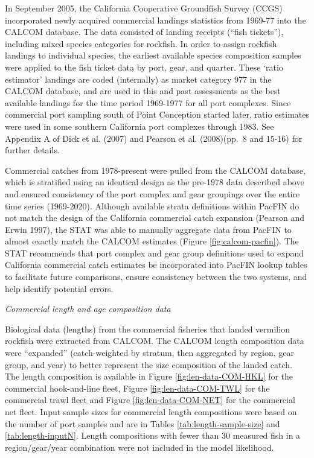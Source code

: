 \documentclass[11pt,
  english,
]{article}
\begin{document}
In September 2005, the California Cooperative Groundfish Survey (CCGS) incorporated newly acquired commercial landings statistics from 1969-77 into the CALCOM database. The data consisted of landing receipts (``fish tickets''), including mixed species categories for rockfish. In order to assign rockfish landings to individual species, the earliest available species composition samples were applied to the fish ticket data by port, gear, and quarter. These `ratio estimator' landings are coded (internally) as market category 977 in the CALCOM database, and are used in this and past assessments as the best available landings for the time period 1969-1977 for all port complexes. Since commercial port sampling south of Point Conception started later, ratio estimates were used in some southern California port complexes through 1983. See Appendix A of Dick et al. {(2007)\leavevmode\tagmcend\tagstructend} and Pearson et al. {(2008)\leavevmode\tagmcend\tagstructend}(pp.~8 and 15-16) for further details.

Commercial catches from 1978-present were pulled from the CALCOM database, which is stratified using an identical design as the pre-1978 data described above and ensured consistency of the port complex and gear groupings over the entire time series (1969-2020). Although available strata definitions within PacFIN do not match the design of the California commercial catch expansion {(Pearson and Erwin 1997)\leavevmode\tagmcend\tagstructend}, the STAT was able to manually aggregate data from PacFIN to almost exactly match the CALCOM estimates (Figure \ref{fig:calcom-pacfin}). The STAT recommends that port complex and gear group definitions used to expand California commercial catch estimates be incorporated into PacFIN lookup tables to facilitate future comparisons, ensure consistency between the two systems, and help identify potential errors.

\emph{Commercial length and age composition data}

Biological data (lengths) from the commercial fisheries that landed vermilion rockfish were extracted from CALCOM. The CALCOM length composition data were ``expanded'' (catch-weighted by stratum, then aggregated by region, gear group, and year) to better represent the size composition of the landed catch. The length composition is available in Figure \ref{fig:len-data-COM-HKL} for the commercial hook-and-line fleet, Figure \ref{fig:len-data-COM-TWL} for the commercial trawl fleet and Figure \ref{fig:len-data-COM-NET} for the commercial net fleet. Input sample sizes for commercial length compositions were based on the number of port samples and are in Tables \ref{tab:length-sample-size} and \ref{tab:length-inputN}. Length compositions with fewer than 30 measured fish in a region/gear/year combination were not included in the model likelihood.
\end{document}
